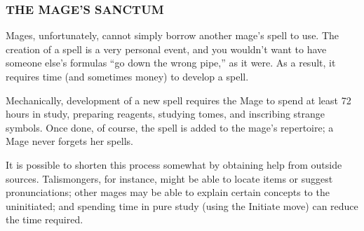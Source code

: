 \documentclass[oneside,10pt]{article}
\begin{document}
\begin{multicols}{2}
\subsubsection{THE MAGE'S SANCTUM}
Mages, unfortunately, cannot simply borrow another mage’s
spell to use. The creation of a spell is a very personal event,
and you wouldn’t want to have someone else’s formulas “go
down the wrong pipe,” as it were. As a result, it requires time
(and sometimes money) to develop a spell.

Mechanically, development of a new spell requires the Mage
to spend at least 72 hours in study, preparing reagents,
studying tomes, and inscribing strange symbols. Once done,
of course, the spell is added to the mage’s repertoire; a Mage
never forgets her spells.

It is possible to shorten this process somewhat by obtaining
help from outside sources. Talismongers, for instance, might
be able to locate items or suggest pronunciations; other mages may be able to explain certain concepts to the uninitiated;
and spending time in pure study (using the Initiate move) can
reduce the time required.

\end{multicols}


\end{document}
